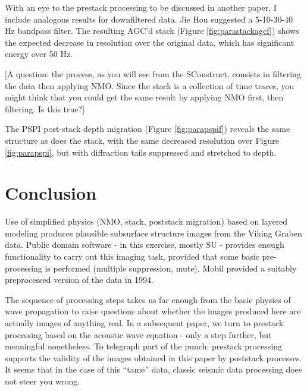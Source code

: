 With an eye to the prestack processing to be discussed in another paper, I include analogous results for downfiltered data. Jie Hou suggested a 5-10-30-40 Hz bandpass filter. The resulting AGC'd stack (Figure \ref{fig:parastackagcf}) shows the expected decrease in resolution over the original data, which has significant energy over 50 Hz. 

[A question: the process, as you will see from the SConstruct, consists in filtering the data then applying NMO. Since the stack is a collection of time traces, you might think that you could get the same result by applying NMO first, then filtering. Is this true?]

The PSPI post-stack depth migration (Figure \ref{fig:parapspif}) reveals the same structure as does the stack, with the same decreased resolution over Figure \ref{fig:parapspi}, but with diffraction tails suppressed and stretched to depth.

\section{Conclusion}
Use of simplified physics (NMO, stack, poststack migration) based on layered modeling produces plausible subsurface structure images from the Viking Graben data. Public domain software - in this exercise, mostly SU - provides enough functionality to carry out this imaging task, provided that some basic pre-processing is performed (multiple suppression, mute). Mobil provided a suitably preprocessed version of the data in 1994.

The sequence of processing steps takes us far enough from the basic physics of wave propagation to raise questions about whether the images produced here are actually images of anything real. In a subsequent paper, we turn to prestack processing based on the acoustic wave equation - only a step further, but meaningful nonetheless. To telegraph part of the punch: prestack processing supports the validity of the images obtained in this paper by poststack processes. It seems that in the case of this ``tame'' data, classic seismic data processing does not steer you wrong.






